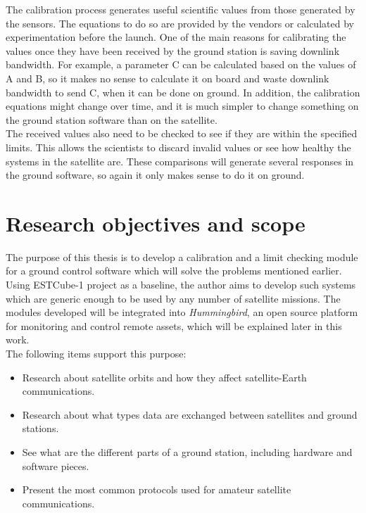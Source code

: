 The calibration process generates useful scientific values from those generated by the sensors. The equations to do so are provided by the vendors or calculated by experimentation before the launch. One of the main reasons for calibrating the values once they have been received by the ground station is saving downlink bandwidth. For example, a parameter C can be calculated based on the values of A and B, so it makes no sense to calculate it on board and waste downlink bandwidth to send C, when it can be done on ground.  In addition, the calibration equations might change over time, and it is much simpler to change something on the ground station software than on the satellite.\\


The received values also need to be checked to see if they are within the specified limits. This allows the scientists to discard invalid values or see how healthy the systems in the satellite are. These comparisons will generate several responses in the ground software, so again it only makes sense to do it on ground. 
\pagebreak

\section{Research objectives and scope}

The purpose of this thesis is to develop a calibration and a limit checking module for a ground control software which will solve the problems mentioned earlier.\\

Using ESTCube-1 project as a baseline, the author aims to develop such systems which are generic enough to be used by any number of satellite missions. The modules developed will be integrated into \emph{Hummingbird}, an open source platform for monitoring and control remote assets, which will be explained later in this work.\\ 
The following items support this purpose:
\begin{itemize}
	\item Research about satellite orbits and how they affect satellite-Earth communications.
	\item Research about what types data are exchanged between satellites and ground stations.
	\item See what are the different parts of a ground station, including hardware and software pieces.
	\item Present the most common protocols used for amateur satellite communications. 
\end{itemize}

